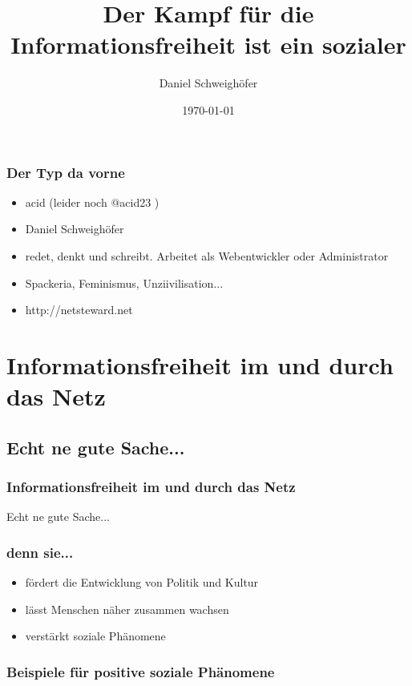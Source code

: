 \documentclass{beamer}
\title{Der Kampf für die Informationsfreiheit ist ein sozialer}
\author{Daniel Schweighöfer}
\date{\today}
\begin{document}
\frame{\titlepage}

\section[Einführung]{}

\frame
{
  \frametitle{Der Typ da vorne}

  \begin{itemize}
  \item acid (leider noch @acid23 )
  \item Daniel Schweighöfer
  \item redet, denkt und schreibt. Arbeitet als Webentwickler oder Administrator
  \item Spackeria, Feminismus, Unziivilisation...
  \item http://netsteward.net
  \end{itemize}
}

\frame{\tableofcontents}

\section{Informationsfreiheit im und durch das Netz}
\subsection{Echt ne gute Sache...}

\frame
{
  \frametitle{Informationsfreiheit im und durch das Netz}
  Echt ne gute Sache...
}

\frame
{
  \frametitle{denn sie...}

  \begin{itemize}[<+->]
  \item fördert die Entwicklung von Politik und Kultur
  \item lässt Menschen näher zusammen wachsen
  \item verstärkt soziale Phänomene
  \end{itemize}
}

\subsubsection{Beispiele für positive soziale Phänomene}
\end{document}
